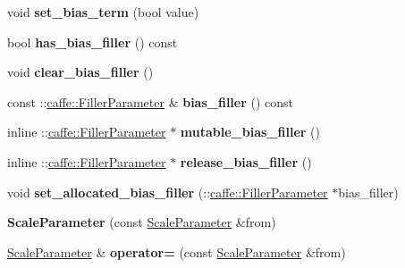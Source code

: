 \begin{DoxyCompactItemize}
void {\bfseries set\+\_\+bias\+\_\+term} (bool value)
\item 
\mbox{\label{classcaffe_1_1_scale_parameter_a7cc0dc45239b49b0cbf19a64bc2724aa}} 
bool {\bfseries has\+\_\+bias\+\_\+filler} () const
\item 
\mbox{\label{classcaffe_1_1_scale_parameter_a5bc3ba1b167435de829b3fc670bf26c6}} 
void {\bfseries clear\+\_\+bias\+\_\+filler} ()
\item 
\mbox{\label{classcaffe_1_1_scale_parameter_a7d877048499cba1698b8604d929f076a}} 
const \+::\mbox{\hyperlink{classcaffe_1_1_filler_parameter}{caffe\+::\+Filler\+Parameter}} \& {\bfseries bias\+\_\+filler} () const
\item 
\mbox{\label{classcaffe_1_1_scale_parameter_a3252f484164d9175f8942ad34b7bfa3e}} 
inline \+::\mbox{\hyperlink{classcaffe_1_1_filler_parameter}{caffe\+::\+Filler\+Parameter}} $\ast$ {\bfseries mutable\+\_\+bias\+\_\+filler} ()
\item 
\mbox{\label{classcaffe_1_1_scale_parameter_a98337d7c240ef31f53948498478d5c16}} 
inline \+::\mbox{\hyperlink{classcaffe_1_1_filler_parameter}{caffe\+::\+Filler\+Parameter}} $\ast$ {\bfseries release\+\_\+bias\+\_\+filler} ()
\item 
\mbox{\label{classcaffe_1_1_scale_parameter_a76e6a06495ea374bdde2fb5337fb6940}} 
void {\bfseries set\+\_\+allocated\+\_\+bias\+\_\+filler} (\+::\mbox{\hyperlink{classcaffe_1_1_filler_parameter}{caffe\+::\+Filler\+Parameter}} $\ast$bias\+\_\+filler)
\item 
\mbox{\label{classcaffe_1_1_scale_parameter_adae76e849244ba5cf055817451c5de7e}} 
{\bfseries Scale\+Parameter} (const \mbox{\hyperlink{classcaffe_1_1_scale_parameter}{Scale\+Parameter}} \&from)
\item 
\mbox{\label{classcaffe_1_1_scale_parameter_a9d88112323d6f869ce17a7ff4d7bc672}} 
\mbox{\hyperlink{classcaffe_1_1_scale_parameter}{Scale\+Parameter}} \& {\bfseries operator=} (const \mbox{\hyperlink{classcaffe_1_1_scale_parameter}{Scale\+Parameter}} \&from)

\end{DoxyCompactItemize}
